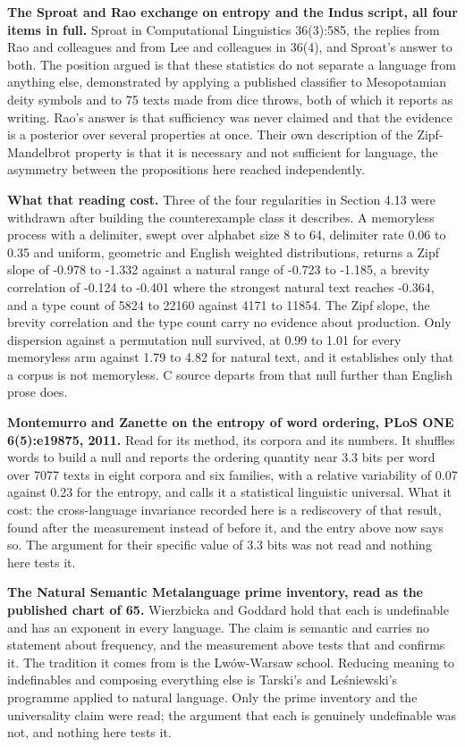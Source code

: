 \textbf{The Sproat and Rao exchange on entropy and the Indus script, all four items in full.} Sproat in Computational Linguistics 36(3):585, the replies from Rao and colleagues and from Lee and colleagues in 36(4), and Sproat's answer to both. The position argued is that these statistics do not separate a language from anything else, demonstrated by applying a published classifier to Mesopotamian deity symbols and to 75 texts made from dice throws, both of which it reports as writing. Rao's answer is that sufficiency was never claimed and that the evidence is a posterior over several properties at once. Their own description of the Zipf-Mandelbrot property is that it is necessary and not sufficient for language, the asymmetry between the propositions here reached independently.

\textbf{What that reading cost.} Three of the four regularities in Section 4.13 were withdrawn after building the counterexample class it describes. A memoryless process with a delimiter, swept over alphabet size 8 to 64, delimiter rate 0.06 to 0.35 and uniform, geometric and English weighted distributions, returns a Zipf slope of -0.978 to -1.332 against a natural range of -0.723 to -1.185, a brevity correlation of -0.124 to -0.401 where the strongest natural text reaches -0.364, and a type count of 5824 to 22160 against 4171 to 11854. The Zipf slope, the brevity correlation and the type count carry no evidence about production. Only dispersion against a permutation null survived, at 0.99 to 1.01 for every memoryless arm against 1.79 to 4.82 for natural text, and it establishes only that a corpus is not memoryless. C source departs from that null further than English prose does.

\textbf{Montemurro and Zanette on the entropy of word ordering, PLoS ONE 6(5):e19875, 2011.} Read for its method, its corpora and its numbers. It shuffles words to build a null and reports the ordering quantity near 3.3 bits per word over 7077 texts in eight corpora and six families, with a relative variability of 0.07 against 0.23 for the entropy, and calls it a statistical linguistic universal. What it cost: the cross-language invariance recorded here is a rediscovery of that result, found after the measurement instead of before it, and the entry above now says so. The argument for their specific value of 3.3 bits was not read and nothing here tests it.

\textbf{The Natural Semantic Metalanguage prime inventory, read as the published chart of 65.} Wierzbicka and Goddard hold that each is undefinable and has an exponent in every language. The claim is semantic and carries no statement about frequency, and the measurement above tests that and confirms it. The tradition it comes from is the Lwów-Warsaw school. Reducing meaning to indefinables and composing everything else is Tarski's and Leśniewski's programme applied to natural language. Only the prime inventory and the universality claim were read; the argument that each is genuinely undefinable was not, and nothing here tests it.

